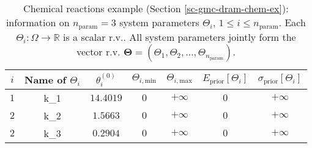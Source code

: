 \begin{table}[h!]
\begin{center}
\begin{tabular}{|c|c|c|c|c|c|c|}
\hline
 $i$      & Name of $\Theta_i$ & $\theta_i^{(0)}$ & $\Theta_{i,\text{min}}$ & $\Theta_{i,\text{max}}$ & $E_{\text{prior}}[\Theta_i]$ & $\sigma_{\text{prior}}[\Theta_i]$ \\
\hline
\hline
 $1$      & k\_1               & $14.4019$        & $0$                     & $+\infty$               & $0$                          & $+\infty$                         \\
\hline
 $2$      & k\_2               & $1.5663$         & $0$                     & $+\infty$               & $0$                          & $+\infty$                         \\
\hline
 $2$      & k\_3               & $0.2904$         & $0$                     & $+\infty$               & $0$                          & $+\infty$                         \\
\hline
\end{tabular}
\caption{Chemical reactions example (Section \ref{sc-gmc-dram-chem-ex}):
information on $n_{\text{param}}=3$ system parameters $\Theta_i$, $1\leqslant i\leqslant n_{\text{param}}$.
Each $\Theta_i:\Omega\rightarrow\mathbb{R}$ is a scalar r.v..
All system parameters jointly form the vector r.v. $\boldsymbol{\Theta}=(\Theta_1,\Theta_2,\ldots,\Theta_{n_{\text{param}}})$.
}
\label{tab-dram-chem-ex-sys-input-params}
\end{center}
\end{table}

